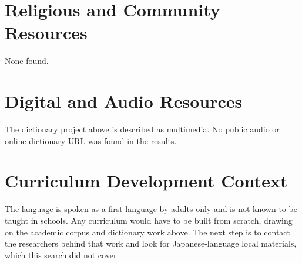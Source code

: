 \documentclass[12pt]{article}
\begin{document}
\section{Religious and Community Resources}
None found.

\section{Digital and Audio Resources}
The dictionary project above is described as multimedia. No public audio or online dictionary URL was found in the results.

\section{Curriculum Development Context}
The language is spoken as a first language by adults only and is not known to be taught in schools. Any curriculum would have to be built from scratch, drawing on the academic corpus and dictionary work above. The next step is to contact the researchers behind that work and look for Japanese-language local materials, which this search did not cover.
\end{document}
